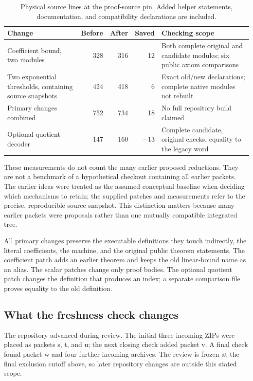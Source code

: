\documentclass[11pt]{article}
\begin{document}
\begin{table}[ht]
\centering\small
\begin{tabularx}{\textwidth}{@{}YrrrY@{}}
\toprule
Change & Before & After & Saved & Checking scope\\
\midrule
Coefficient bound, two modules & 328 & 316 & 12 &
Both complete original and candidate modules; six public axiom comparisons\\
Two exponential thresholds, containing source snapshots & 424 & 418 & 6 &
Exact old/new declarations; complete native modules not rebuilt\\
\midrule
Primary changes combined & 752 & 734 & 18 & No full repository build claimed\\
\midrule
Optional quotient decoder & 147 & 160 & $-13$ &
Complete candidate, original checks, equality to the legacy word\\
\bottomrule
\end{tabularx}
\caption{Physical source lines at the proof-source pin. Added helper statements,
documentation, and compatibility declarations are included.}
\end{table}

These measurements do not count the many earlier proposed reductions. They are not a
benchmark of a hypothetical checkout containing all earlier packets. The earlier ideas
were treated as the assumed conceptual baseline when deciding which mechanisms to
retain; the supplied patches and measurements refer to the precise, reproducible source
snapshot. This distinction matters because many earlier packets were proposals rather
than one mutually compatible integrated tree.

All primary changes preserve the executable definitions they touch indirectly, the
literal coefficients, the machine, and the original public theorem statements. The
coefficient patch adds an earlier theorem and keeps the old linear-bound name as an
alias. The scalar patches
change only proof bodies. The optional quotient patch changes the definition that
produces an index; a separate comparison file proves equality to the old definition.

\subsection{What the freshness check changes}

The repository advanced during review. The initial three incoming ZIPs were placed as
packets s, t, and u; the next closing check added packet v. A final check found packet w
and four further incoming archives. The review is frozen at the final exclusion cutoff
above, so later repository changes are outside this stated scope.
\end{document}
